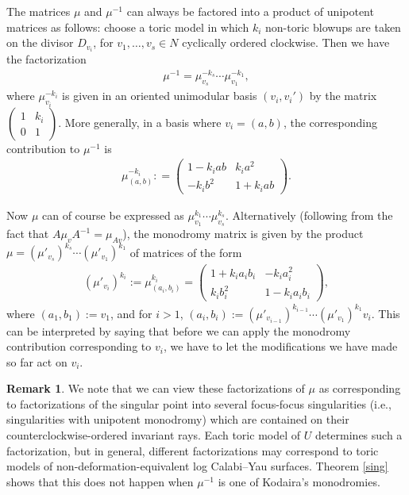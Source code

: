 \documentclass[pdftex]{sigma}
\numberwithin{equation}{section}
\numberwithin{figure}{section}
\numberwithin{table}{section}
\theoremstyle{definition}
\newtheorem{rmk}[thm]{Remark}
\begin{document}
The matrices $\mu$ and $\mu^{-1}$ can always be factored into a product of unipotent matrices as follows: choose a toric model in which $k_i$ non-toric blowups are taken on the divisor $D_{v_i}$, for $v_1,\dots,v_s\in N$ cyclically ordered clockwise. Then we have the factorization
\begin{align}
	\mu^{-1} = \mu_{v_s}^{-k_s} \cdots \mu_{v_1}^{-k_1},
\end{align}
where $\mu_{v_i}^{-k_i}$ is given in an oriented unimodular basis $(v_i,v_i')$ by the matrix $	\left(\begin{smallmatrix}
		1 &k_i \\
		0 &1
		\end{smallmatrix}\right)$.
 More generally, in a basis where $v_i = (a,b)$, the corresponding contribution to $\mu^{-1}$ is
\begin{gather}\label{genmut}
	\mu_{(a,b)}^{-k_i} :
		= \left(\begin{matrix}
		1- k_i a b &k_i a^2 \\
		-k_i b^2 &1+k_i a b
		\end{matrix}\right).
\end{gather}

Now $\mu$ can of course be expressed as $\mu_{v_1}^{k_1} \cdots \mu_{v_s}^{k_s}$. Alternatively (following from the fact that $A\mu_v A^{-1}=\mu_{Av}$), the monodromy matrix is given by the product $\mu=(\mu'_{v_s})^{k_s} \cdots (\mu'_{v_1})^{k_1}$ of matrices of the form
\begin{align}\label{hardmu}
	(\mu'_{v_i})^{k_i}:=\mu_{(a_i,b_i)}^{k_i}
		= \left(\begin{matrix}
		1+ k_i a_i b_i &-k_i a_i^2 \\
		k_i b_i^2 &1-k_i a_i b_i
		\end{matrix}\right),
\end{align}
where $(a_1,b_1):=v_1$, and for $i>1$, $(a_i,b_i):=(\mu'_{v_{i-1}})^{k_{i-1}}\cdots (\mu'_{v_1})^{k_1} v_i$. This can be interpreted by saying that before we can apply the monodromy contribution corresponding to $v_i$, we have to let the modifications we have made so far act on $v_i$.

\begin{rmk}\label{factor}We note that we can view these factorizations of $\mu$ as corresponding to factorizations of the singular point into several focus-focus singularities (i.e., singularities with unipotent monodromy) which are contained on their counterclockwise-ordered invariant rays. Each toric model of $U$ determines such a factorization, but in general, different factorizations may correspond to toric models of non-deformation-equivalent log Calabi--Yau surfaces. Theorem \ref{sing} shows that this does not happen when $\mu^{-1}$ is one of Kodaira's monodromies.
\end{rmk}
\end{document}
